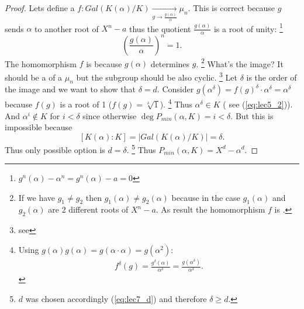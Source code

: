 \begin{proposition}
\begin{proof}
    Lets define a 
    $f: Gal\left(K\left(\alpha\right)/K\right) \xrightarrow[g \to
      \frac{g\left(\alpha\right)}{\alpha}]{} \mu_n$. This is correct
    because $g$ sends $\alpha$ to another root of $X^n - a$ thus the
    quotient $\frac{g\left(\alpha\right)}{\alpha}$ is a root of unity:
    \footnote{
      $g^n\left(\alpha\right) - \alpha^n =
      g^n\left(\alpha\right) - a = 0$
    }
    \[
    \left(\frac{g\left(\alpha\right)}{\alpha}\right)^n = 1.
    \]
    The homomorphism $f$ is  because
    $g\left(\alpha\right)$ determines $g$.
    \footnote{
      If we have $g_1 \ne g_2$ then
      $g_1\left(\alpha\right) \ne g_2\left(\alpha\right)$ because
      in the case $g_1\left(\alpha\right)$ and
      $g_2\left(\alpha\right)$ are 2 different roots of $X^n - a$.
      As result the homomorphism $f$ is .
    }
    What's the image? It should
    be a  of a  $\mu_n$
    but the subgroup should be also cyclic. 
    \footnote{
      see 
    }
    Let $\delta$ is the order of the image and we want to show that
    $\delta = d$. Consider
    $g\left(\alpha^\delta\right) = f\left(g\right)^\delta \cdot
    \alpha^\delta = \alpha^\delta$ because $f\left(g\right)$ is a root
    of 1 ($f\left(g\right) = \sqrt[\delta]{1}$).
    \footnote{
      Using $g\left(\alpha\right)g\left(\alpha\right) = g\left(\alpha
      \cdot \alpha \right) = g\left(\alpha^2\right)$:
      \begin{eqnarray}
        f^\delta\left(g\right) =
        \frac{g^\delta\left(\alpha\right)}{\alpha^\delta} =
        \frac{g\left(\alpha^\delta\right)}{\alpha^\delta}.
        \nonumber
      \end{eqnarray}      
    }
    Thus $\alpha^\delta
    \in K$ ( see (\ref{eq:lec5_2})). And $\alpha^i \notin K$ for $i < \delta$ since otherwise
    $\deg P_{min}\left(\alpha, K\right) = i < \delta$. But this is
    impossible because
    \[
    \left[K\left(\alpha\right):K\right] =
    \left|Gal\left(K\left(\alpha\right)/K\right)\right| = \delta.
    \]
    Thus only possible option is $d = \delta$.
    \footnote{
      $d$ was chosen accordingly (\ref{eq:lec7_d}) and therefore
      $\delta \ge d$.
    }
    Thus
    $P_{min}\left(\alpha, K\right) = X^d - \alpha^d$.
  \end{proof}
\end{proposition}


